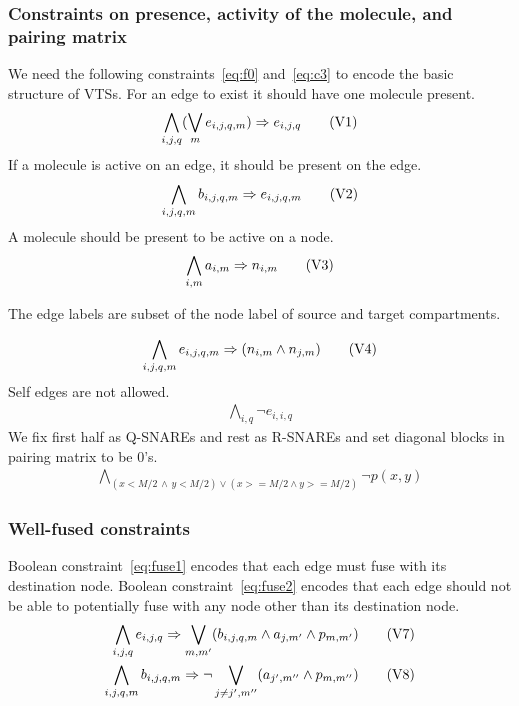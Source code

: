 \subsubsection{Constraints on presence, activity of the molecule, and pairing matrix}
%
We need the following constraints~\eqref{eq:f0} and~\eqref{eq:c3}
to encode the basic structure of VTSs.
%
For an edge to exist it should have one molecule present. 
%
\begin{align}
  \bigwedge\limits_{i,j,q} (\bigvee_m e_{i,j,q,m} )\Rightarrow e_{i,j,q}\tag{V1}\label{eq:f0}
\end{align}
If a molecule is active on an edge, it should be present on the edge.
%
\begin{align}
  \bigwedge\limits_{i,j,q,m} b_{i,j,q,m} \Rightarrow e_{i,j,q,m}\tag{V2}\label{eq:f1}
\end{align}
A molecule should be present to be active on a node.  
\begin{align}
  \bigwedge\limits_{i,m} a_{i,m} \Rightarrow n_{i,m}
  \tag{V3}\label{eq:c4}
\end{align}

The edge labels are subset of the node label of source and target compartments.

\begin{align}
  \bigwedge\limits_{i,j,q,m} e_{i,j,q,m} \Rightarrow (n_{i,m} \land n_{j,m} )\tag{V4}\label{eq:c0}
\end{align}
Self edges are not allowed. 
\begin{align}
   \bigwedge\limits_{i,q} \neg e_{i,i,q}\tag{V5}\label{eq:c2}
\end{align}
We fix first half as Q-SNAREs and rest as R-SNAREs and set diagonal blocks in pairing matrix to be 0's.
\begin{align}
  \bigwedge\limits_{(x < M/2 \, \land  \, y < M/2) \lor  (x >= M/2 \land y >= M/2)} \neg p(x,y)
  \tag{V6}\label{eq:c3}
\end{align}

\subsubsection{Well-fused constraints}
Boolean constraint~\eqref{eq:fuse1} encodes that each edge must fuse with
its destination node.
%
Boolean constraint~\eqref{eq:fuse2} encodes that each edge should not
be able to potentially fuse with any node other than its destination node.
\begin{align}
  \bigwedge\limits_{i,j,q} e_{i,j,q} \Rightarrow \bigvee_{m,m^{\prime}} (b_{i,j,q,m} \land a_{j,m^{\prime}} \land p_{m,m^{\prime}})
  \tag{V7}\label{eq:fuse1}  \\
\bigwedge\limits_{i,j,q,m} b_{i,j,q,m} \Rightarrow \neg \bigvee_{j \neq j^{\prime}, m^{\prime\prime}} ( a_{j^{\prime},m^{\prime\prime}} \land p_{m,m^{\prime\prime}})
  \tag{V8}\label{eq:fuse2}  
\end{align}


